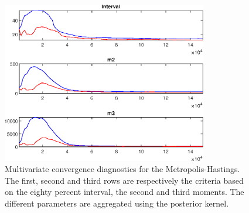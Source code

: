  
\begin{figure}[H]
\centering 
\includegraphics[width=0.8\textwidth]{BRS_sectoral_KK/Output/BRS_sectoral_KK_mdiag}
\caption{Multivariate convergence diagnostics for the Metropolis-Hastings.
The first, second and third rows are respectively the criteria based on
the eighty percent interval, the second and third moments. The different 
parameters are aggregated using the posterior kernel.}\label{Fig:MultivariateDiagnostics}
\end{figure}

